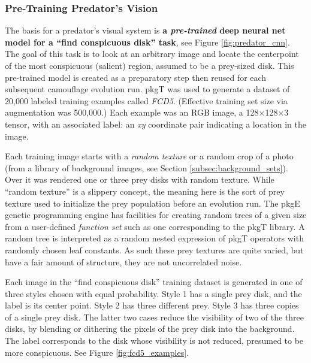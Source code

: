 \documentclass[acmtog]{acmart}
\newcommand{\jargon}[1]{\textit{#1}}
\newcommand{\texsyn}[0]{pkgT}
\newcommand{\lazypredator}[0]{pkgE}
\begin{document}
\subsubsection{Pre-Training Predator's Vision}
\label{sec:pre_train_predator}
The basis for a predator's visual system is \textbf{a \jargon{pre-trained} deep neural net model for a “find conspicuous disk” task}, see Figure \ref{fig:predator_cnn}. The goal of this task is to look at an arbitrary image and locate the centerpoint of the most conspicuous (salient) region, assumed to be a prey-sized disk. This pre-trained model is created as a preparatory step then reused for each subsequent camouflage evolution run. \texsyn{} was used to generate a dataset of 20,000 labeled training examples called \jargon{FCD5}. (Effective training set size via augmentation was 500,000.) Each example was an RGB image, a 128×128×3 tensor, with an associated label: an \textit{xy} coordinate pair indicating a location in the image.
\par
Each training image starts with a \jargon{random texture} or a random crop of a photo (from a library of background images, see Section \ref{subsec:background_sets}). Over it was rendered one or three prey disks with random texture. While “random texture” is a slippery concept, the meaning here is the sort of prey texture used to initialize the prey population before an evolution run. The \lazypredator{} genetic programming engine has facilities for creating random trees of a given size from a user-defined \jargon{function set} such as one corresponding to the \texsyn{} library. A random tree is interpreted as a random nested expression of \texsyn{} operators with randomly chosen leaf constants. As such these prey textures are quite varied, but have a fair amount of structure, they are not uncorrelated noise.
\par
Each image in the “find conspicuous disk” training dataset is generated in one of three styles chosen with equal probability. Style 1 has a single prey disk, and the label is its center point. Style 2 has three different prey. Style 3 has three copies of a single prey disk. The latter two cases reduce the visibility of two of the three disks, by blending or dithering the pixels of the prey disk into the background. The label corresponds to the disk whose visibility is not reduced, presumed to be more conspicuous. See Figure \ref{fig:fcd5_examples}.
\par
\end{document}
